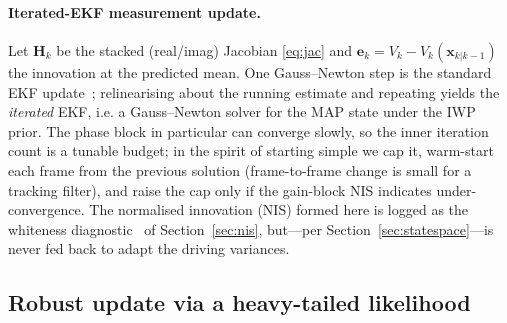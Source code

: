 \documentclass[11pt]{article}
\begin{document}
\paragraph{Iterated-EKF measurement update.} Let $\bm{H}_k$ be the stacked (real/imag) Jacobian
\eqref{eq:jac} and $\bm{e}_k=V_k-\hat V_k(\bm{x}_{k|k-1})$ the innovation at the predicted mean.
One Gauss--Newton step is the standard EKF update~\cite{barshalom}; relinearising about the running estimate and
repeating yields the \emph{iterated} EKF, i.e. a Gauss--Newton solver for the MAP state under
the IWP prior. The phase block in particular can converge slowly, so the inner iteration count is
a tunable budget; in the spirit of starting simple we cap it, warm-start each frame from the
previous solution (frame-to-frame change is small for a tracking filter), and raise the cap only if
the gain-block NIS indicates under-convergence. The normalised innovation (NIS) formed here is logged
as the whiteness diagnostic~\cite{kailath} of Section~\ref{sec:nis}, but---per
Section~\ref{sec:statespace}---is never fed back to adapt the driving variances.

\subsection{Robust update via a heavy-tailed likelihood}
\label{sec:robust}
\end{document}
